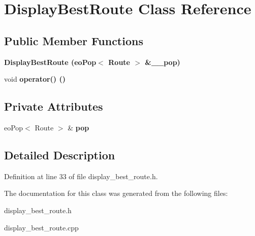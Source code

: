 \section{Display\-Best\-Route Class Reference}
\label{class_display_best_route}
\subsection*{Public Member Functions}
\begin{CompactItemize}
\item 
\bf{Display\-Best\-Route} (eo\-Pop$<$ Route $>$ \&\_\-\_\-pop)\label{class_display_best_route_db263e38f1e82174f811bf62f323f87f}

\item 
void \bf{operator()} ()\label{class_display_best_route_ee879344a6d8b81a04d4eabbed2c7a04}

\end{CompactItemize}
\subsection*{Private Attributes}
\begin{CompactItemize}
\item 
eo\-Pop$<$ Route $>$ \& \bf{pop}\label{class_display_best_route_5270aabbf294d2deca9878934216eb89}

\end{CompactItemize}


\subsection{Detailed Description}




Definition at line 33 of file display\_\-best\_\-route.h.

The documentation for this class was generated from the following files:\begin{CompactItemize}
\item 
display\_\-best\_\-route.h\item 
display\_\-best\_\-route.cpp\end{CompactItemize}
